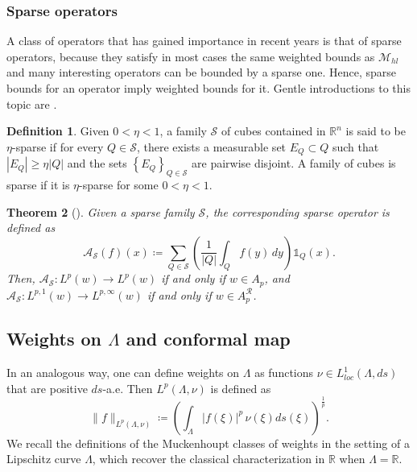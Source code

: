 \documentclass[12pt]{amsart}
\newcommand{\R}{\mathbb{R}}
\theoremstyle{plain}
\newtheorem{theorem}{Theorem}[section]
\theoremstyle{definition}
\newtheorem{definition}[theorem]{Definition}
\numberwithin{equation}{section}
\begin{document}
\subsubsection{Sparse operators}

A class of operators that has gained importance in recent years is that of sparse operators, because they satisfy in most cases the same weighted bounds as $\mathcal{M}_{hl}$ and many interesting operators can be bounded by a sparse one. Hence, sparse bounds for an operator imply weighted bounds for it. Gentle introductions to this topic are \cite{LernerNazarov,PereyraSparse}. 

\begin{definition}
Given $0<\eta<1$, a family $\mathcal{S}$ of cubes contained in $\mathbb{R}^n$ is said to be $\eta$-sparse if for every $Q \in \mathcal{S}$, there exists a measurable set $E_Q \subset Q$ such that $\left|E_Q\right| \geq \eta|Q|$ and the sets $\left\{E_Q\right\}_{Q \in \mathcal{S}}$ are pairwise disjoint. A family of cubes is sparse if it is $\eta$-sparse for some $0<\eta<1$.   
\end{definition}

\begin{theorem}[\cite{LernerSparse,carroDomingoSalazar}]

Given a sparse family $\mathcal{S}$, the corresponding sparse operator is defined as
\[
\mathcal{A}_{\mathcal{S}}(f)(x)
\coloneqq
\sum_{Q \in \mathcal{S}} \left(\frac{1}{|Q|} \int_Q f(y)\, dy\right) \mathds{1}_{Q}(x).
\]
Then, $\mathcal{A}_{\mathcal{S}}\colon L^p(w)\to L^p(w)$ if and only if $w\in A_p$, and $\mathcal{A}_{\mathcal{S}}\colon L^{p,1}(w)\to L^{p,\infty}(w)$ if and only if $w\in A_p^{\mathcal{R}}$.
\end{theorem}






\subsection{Weights on \texorpdfstring{$\Lambda$}{} and conformal map}


In an analogous way, one can define weights on $\Lambda$ as functions $\nu\in L_{loc}^{1}(\Lambda,ds)$  that are positive $ds$-a.e. Then $L^p(\Lambda, \nu)$ is defined as
\[
\|f\|_{L^{p}(\Lambda,\nu)}
\coloneqq 
\left(\int_{\Lambda}|f(\xi)|^p\, \nu(\xi)ds(\xi)\right)^{\frac{1}{p}}.
\]
We recall the definitions of the Muckenhoupt classes of weights in the setting of a Lipschitz curve $\Lambda$, which recover the classical characterization in $\R$ when $\Lambda=\R$.
\end{document}
